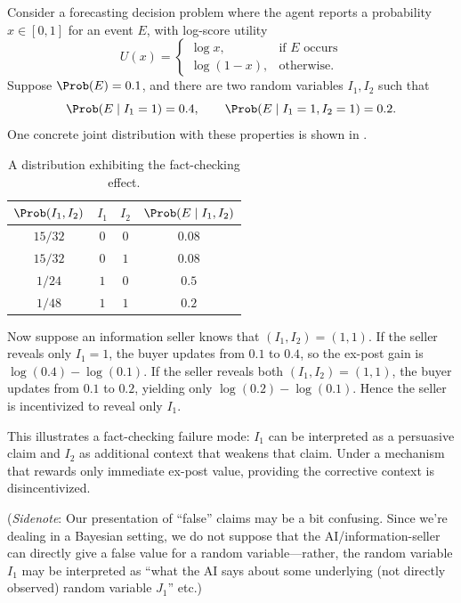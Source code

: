 \begin{example}

Consider a forecasting decision problem where the agent reports a probability $x\in[0,1]$ for an event $E$, with log-score utility
  \[
  U(x)=
  \begin{cases}
  \log x, & \text{if } E \text{ occurs}\\
  \log(1-x), & \text{otherwise.}
  \end{cases}
  \]
  Suppose $\Prob(E)=0.1$, and there are two random variables $I_1,I_2$ such that
  \[
  \Prob(E\mid I_1=1)=0.4,\qquad \Prob(E\mid I_1=1,I_2=1)=0.2.
  \]
  One concrete joint distribution with these properties is shown in .

  \begin{table}[h]
  \centering
  \caption{A distribution exhibiting the fact-checking effect.}
  \label{infonomy:tab:factcheck-example}
  \begin{tabular}{cccc}
  \toprule
  $\Prob(I_1,I_2)$ & $I_1$ & $I_2$ & $\Prob(E\mid I_1,I_2)$ \\
  \midrule
  $15/32$ & $0$ & $0$ & $0.08$ \\
  $15/32$ & $0$ & $1$ & $0.08$ \\
  $1/24$  & $1$ & $0$ & $0.5$ \\
  $1/48$  & $1$ & $1$ & $0.2$ \\
  \bottomrule
  \end{tabular}
  \end{table}

  Now suppose an information seller knows that $(I_1,I_2)=(1,1)$. If the seller reveals only $I_1=1$, the buyer updates from $0.1$ to $0.4$, so the ex-post gain is $\log(0.4)-\log(0.1)$. If the seller reveals both $(I_1,I_2)=(1,1)$, the buyer updates from $0.1$ to $0.2$, yielding only $\log(0.2)-\log(0.1)$. Hence the seller is incentivized to reveal only $I_1$.

  This illustrates a fact-checking failure mode: $I_1$ can be interpreted as a persuasive claim and $I_2$ as additional context that weakens that claim. Under a mechanism that rewards only immediate ex-post value, providing the corrective context is disincentivized.


  (\emph{Sidenote}: Our presentation of ``false'' claims may be a bit confusing. Since we're dealing in a Bayesian setting, we do not suppose that the AI/information-seller can directly give a false value for a random variable---rather, the random variable $I_1$ may be interpreted as ``what the AI says about some underlying (not directly observed) random variable $J_1$'' etc.)
\end{example}

